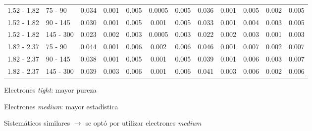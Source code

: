 \documentclass[10pt, compress,spanish]{beamer}
\begin{document}
\begin{frame}[fragile]
\begin{table}
{\begin{tabular}{  l l | c c c c c | c c c c c}
  1.52 - 1.82 & 75 - 90   & 0.034  & 0.001 & 0.005  &  0.0005 &  0.005  & 0.036  & 0.001 & 0.005  &  0.002  &  0.005 \\

  1.52 - 1.82 & 90 - 145  & 0.030  & 0.001 & 0.005  &  0.001  &  0.005  & 0.033  & 0.001 & 0.004  &  0.003  &  0.005  \\

  1.52 - 1.82 & 145 - 300 & 0.023  & 0.002 & 0.003  &  0.0005 &  0.003  & 0.022  & 0.002 & 0.003  &  0.001  &  0.003  \\

  \hline

  1.82 - 2.37 & 75 - 90   & 0.044   & 0.001 & 0.006 &  0.002  &  0.006  & 0.046   & 0.001 & 0.007 &  0.002  &  0.007  \\

  1.82 - 2.37 & 90 - 145  & 0.038   & 0.001 & 0.005 &  0.001  &  0.005  & 0.039   & 0.001 & 0.006 &  0.003  &  0.007  \\

  1.82 - 2.37 & 145 - 300 & 0.039   & 0.003 & 0.006 &  0.001  &  0.006  & 0.041   & 0.003 & 0.006 &  0.002  &  0.006  \\

  \hline
  \hline

\end{tabular}}
\end{table}

Electrones \textit{tight}: mayor pureza

Electrones \textit{medium}: mayor estadística

\hrulefill

Sistemáticos similares $\longrightarrow$ se optó por utilizar electrones \textit{medium}

\end{frame}



\end{document}
